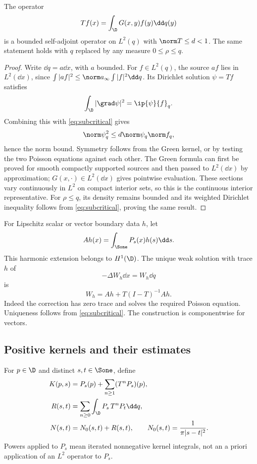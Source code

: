 \begin{lemma}\label{lem:green-operator}
The operator
\[
Tf(x)=\int_\D G(x,y)f(y)\dd q(y)
\]
is a bounded self-adjoint operator on $L^2(q)$ with $\norm T\le d<1$. The same statement holds with $q$ replaced by any measure $0\le\rho\le q$.
\end{lemma}
\begin{proof}
Write $\dd q=a\dd x$, with $a$ bounded. For $f\in L^2(q)$, the source $af$ lies in $L^2(\dd x)$, since $\int|af|^2\le\norm a_\infty\int|f|^2\dd q$. Its Dirichlet solution $\psi=Tf$ satisfies
\[
\int_\D|\grad\psi|^2=\ip{\psi}{f}_q.
\]
Combining this with \eqref{eq:subcritical} gives
\[
\norm\psi_q^2\le d\norm\psi_q\norm f_q,
\]
hence the norm bound. Symmetry follows from the Green kernel, or by testing the two Poisson equations against each other. The Green formula can first be proved for smooth compactly supported sources and then passed to $L^2(\dd x)$ by approximation; $G(x,\cdot)\in L^2(\dd x)$ gives pointwise evaluation. These sections vary continuously in $L^2$ on compact interior sets, so this is the continuous interior representative. For $\rho\le q$, its density remains bounded and its weighted Dirichlet inequality follows from \eqref{eq:subcritical}, proving the same result.
\end{proof}

For Lipschitz scalar or vector boundary data $h$, let
\[
Ah(x)=\int_{\Sone}P_s(x)h(s)\dd s.
\]
This harmonic extension belongs to $H^1(\D)$. The unique weak solution with trace $h$ of
\[
-\Delta W_h\dd x=W_h\dd q
\]
is
\begin{equation}\label{eq:extension}
W_h=Ah+T(I-T)^{-1}Ah.
\end{equation}
Indeed the correction has zero trace and solves the required Poisson equation. Uniqueness follows from \eqref{eq:subcritical}. The construction is componentwise for vectors.

\subsection{Positive kernels and their estimates}

For $p\in\D$ and distinct $s,t\in\Sone$, define
\begin{align}
K(p,s)&=P_s(p)+\sum_{n\ge1}(T^nP_s)(p),\label{eq:K}\\
R(s,t)&=\sum_{n\ge0}\int_\D P_s\,T^nP_t\dd q,\label{eq:R}\\
N(s,t)&=N_0(s,t)+R(s,t),\qquad N_0(s,t)=\frac1{\pi|s-t|^2}.\label{eq:N}
\end{align}
Powers applied to $P_s$ mean iterated nonnegative kernel integrals, not an a priori application of an $L^2$ operator to $P_s$.

